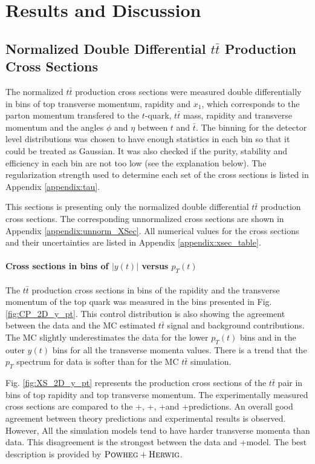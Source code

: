 \chapter{Results and Discussion}\label{chapt:results}

\section{Normalized Double Differential $t\bar{t}$ Production Cross Sections}\label{ssec:xsec_mes}

The normalized $t\bar{t}$ production cross sections were measured double differentially in bins of top transverse momentum, rapidity and  $x_{1}$,
which corresponds to the parton momentum transfered to the $t$-quark,
$t\bar{t}$ mass, rapidity and transverse momentum and the angles $\phi$ and $\eta$ between $t$ and $\bar{t}$.
The binning for the detector level distributions was chosen to have enough statistics in each bin so that it could be treated as Gaussian.
It was also checked if the purity, stability and efficiency in each bin are not too low (see the explanation below).
The regularization strength used to determine each set of the cross sections is listed in Appendix \ref{appendix:tau}.

This sections is presenting only the normalized double differential $t\bar{t}$ production cross sections. The corresponding
unnormalized cross sections are shown in Appendix \ref{appendix:unnorm_XSec}. All numerical values for the cross sections
and their uncertainties are listed in Appendix \ref{appendix:xsec_table}.

\subsubsection{Cross sections in bins of $|y(t)|$ versus $p_{T}(t)$}

The $t\bar{t}$ production cross sections in bins of the rapidity and the transverse momentum of the top quark was
measured in the bins presented in Fig. \ref{fig:CP_2D_y_pt}. This control distribution is also showing the agreement between 
the data and the MC estimated $t\bar{t}$ signal and background contributions. The MC slightly underestimates the data for 
the lower $p_{T}(t)$ bins and in the outer $y(t)$ bins for all the transverse momenta values. There is a trend that the $p_{T}$
spectrum for data is softer than for the MC $t\bar{t}$ simulation.

Fig. \ref{fig:XS_2D_y_pt} represents the production cross sections of the $t\bar{t}$ pair in bins of top rapidity and top transverse momentum.
The experimentally measured cross sections are compared to the \MG+\PYTHIA, \Powheg+\PYTHIA, \Powheg+\HERWIG and \MCNLO+\HERWIG predictions.
An overall good agreement between theory predictions and experimental results is observed. However, All the simulation models tend to have 
harder transverse momenta than data. This disagreement is the strongest between the data and \MG+\PYTHIA model. The best description is provided
by $\textsc{Powheg}+\textsc{Herwig}$.

